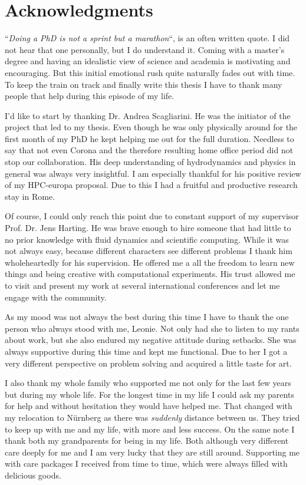 \chapter*{Acknowledgments}

``\textit{Doing a PhD is not a sprint but a marathon}``, is an often written quote.
I did not hear that one personally, but I do understand it.
Coming with a master’s degree and having an idealistic view of science and academia is motivating and encouraging.
But this initial emotional rush quite naturally fades out with time.
To keep the train on track and finally write this thesis I have to thank many people that help during this episode of my life.

I'd like to start by thanking Dr. Andrea Scagliarini. 
He was the initiator of the project that led to my thesis. 
Even though he was only physically around for the first month of my PhD he kept helping me out for the full duration.
Needless to say that not even Corona and the therefore resulting home office period did not stop our collaboration.
His deep understanding of hydrodynamics and physics in general was always very insightful.  
I am especially thankful for his positive review of my HPC-europa proposal.
Due to this I had a fruitful and productive research stay in Rome.

Of course, I could only reach this point due to constant support of my supervisor Prof. Dr. Jens Harting.
He was brave enough to hire someone that had little to no prior knowledge with fluid dynamics and scientific computing.
While it was not always easy, because different characters see different problems I thank him wholeheartedly for his supervision.
He offered me a all the freedom to learn new things and being creative with computational experiments.
His trust allowed me to visit and present my work at several international conferences and let me engage with the community.

As my mood was not always the best during this time I have to thank the one person who always stood with me, Leonie.
Not only had she to listen to my rants about work, but she also endured my negative attitude during setbacks.
She was always supportive during this time and kept me functional.
Due to her I got a very different perspective on problem solving and acquired a little taste for art.

I also thank my whole family who supported me not only for the last few years but during my whole life.
For the longest time in my life I could ask my parents for help and without hesitation they would have helped me.
That changed with my relocation to Nürnberg as there was \textit{suddenly} distance between us.
They tried to keep up with me and my life, with more and less success.
On the same note I thank both my grandparents for being in my life.
Both although very different care deeply for me and I am very lucky that they are still around.
Supporting me with care packages I received from time to time, which were always filled with delicious goods.

